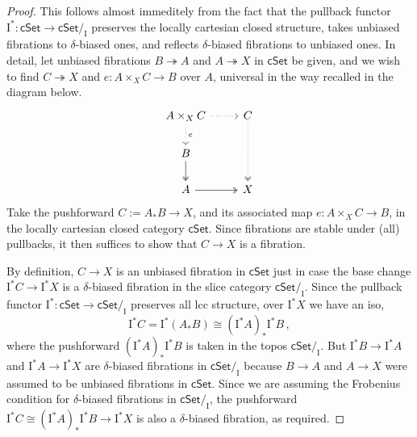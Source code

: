 \documentclass[11pt]{amsart}
\newcommand{\bbC}{\ensuremath{\mathbb{C}}}
\newcommand{\cSet}{\ensuremath{\mathsf{cSet}}}
\newcommand{\fib}{\ensuremath{\twoheadrightarrow}}
\renewcommand{\to}{\ensuremath{\rightarrow}}
\newcommand{\I}{\ensuremath{\mathrm{I}}}
\theoremstyle{remark}
\theoremstyle{definition}
\begin{document}
\begin{proof}
This follows almost immeditely from the fact that the pullback functor $\I^* : \cSet \to \cSet/_\I$ preserves the locally cartesian closed structure, takes unbiased fibrations to $\delta$-biased ones, and reflects $\delta$-biased fibrations to unbiased ones.  In detail, let unbiased fibrations $B \fib A$ and $A \fib X$ in $\cSet$ be given, and we wish to find $C\fib X$ and $e : A\times_X C \to B$ over $A$, universal in the way recalled in the diagram below.
\begin{equation}\label{diagram:biasedFrobenius2unbiasedFrobenius}
\begin{tikzcd}
A \times_X C \ar[d, dotted, "e"] \ar[r, dotted] & C \ar[dd, two heads, dotted]\\
B \ar[d, two heads] &   \\
A \ar[r, two heads]  & X 
\end{tikzcd}
\end{equation}
%
Take the pushforward $C := A_*B \to X$, and its associated map $e : A\times_X C \to B$, in the locally cartesian closed category $\cSet$.  Since fibrations are stable under (all) pullbacks, %
it then suffices to show that $C\to X$ is a fibration.  

By definition, $C\to X$ is an unbiased fibration in $\cSet$ just in case the base change $\I^*C \to \I^*X$ is a $\delta$-biased fibration in the slice category $\cSet/_\I$.  Since the pullback functor $\I^* : \cSet \to \cSet/_\I$ preserves all lcc structure, over $\I^*X$ we have an iso,
\[
\I^*C = \I^*(A_*B) \cong (\I^*A)_*\I^*B\,,
\]
where the pushforward $(\I^*A)_*\I^*B$ is taken in the topos $\cSet/_\I$.  But $\I^*B \to \I^*A$ and $\I^*A \to \I^*X$ are $\delta$-biased fibrations in $\cSet/_\I$ because $B \to A$ and $A \to X$ were assumed to be unbiased fibrations in $\cSet$.  Since we are assuming the Frobenius condition for $\delta$-biased fibrations in $\cSet/_\I$, the pushforward $\I^*C \cong (\I^*A)_*\I^*B \to \I^*X$ is also a $\delta$-biased fibration, as required.
\end{proof}
  
\end{document}
